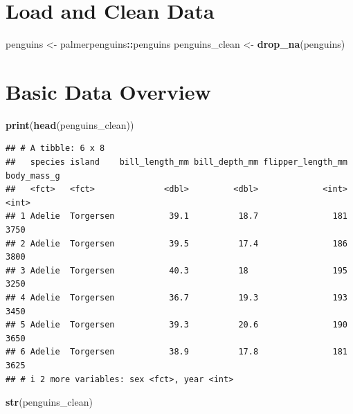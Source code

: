 \documentclass[
]{book}
\newenvironment{Shaded}{\begin{snugshade}}{\end{snugshade}}
\newcommand{\FunctionTok}[1]{\textcolor[rgb]{0.13,0.29,0.53}{\textbf{#1}}}
\newcommand{\NormalTok}[1]{#1}
\newcommand{\OtherTok}[1]{\textcolor[rgb]{0.56,0.35,0.01}{#1}}
\newcommand{\SpecialCharTok}[1]{\textcolor[rgb]{0.81,0.36,0.00}{\textbf{#1}}}
\begin{document}
\hypertarget{load-and-clean-data}{%
\section{Load and Clean Data}\label{load-and-clean-data}}

\begin{Shaded}
\begin{Highlighting}[]
\NormalTok{penguins }\OtherTok{\textless{}{-}}\NormalTok{ palmerpenguins}\SpecialCharTok{::}\NormalTok{penguins}
\NormalTok{penguins\_clean }\OtherTok{\textless{}{-}} \FunctionTok{drop\_na}\NormalTok{(penguins)}
\end{Highlighting}
\end{Shaded}

\hypertarget{basic-data-overview}{%
\section{Basic Data Overview}\label{basic-data-overview}}

\begin{Shaded}
\begin{Highlighting}[]
\FunctionTok{print}\NormalTok{(}\FunctionTok{head}\NormalTok{(penguins\_clean))}
\end{Highlighting}
\end{Shaded}

\begin{verbatim}
## # A tibble: 6 x 8
##   species island    bill_length_mm bill_depth_mm flipper_length_mm body_mass_g
##   <fct>   <fct>              <dbl>         <dbl>             <int>       <int>
## 1 Adelie  Torgersen           39.1          18.7               181        3750
## 2 Adelie  Torgersen           39.5          17.4               186        3800
## 3 Adelie  Torgersen           40.3          18                 195        3250
## 4 Adelie  Torgersen           36.7          19.3               193        3450
## 5 Adelie  Torgersen           39.3          20.6               190        3650
## 6 Adelie  Torgersen           38.9          17.8               181        3625
## # i 2 more variables: sex <fct>, year <int>
\end{verbatim}

\begin{Shaded}
\begin{Highlighting}[]
\FunctionTok{str}\NormalTok{(penguins\_clean)}
\end{Highlighting}
\end{Shaded}
\end{document}
